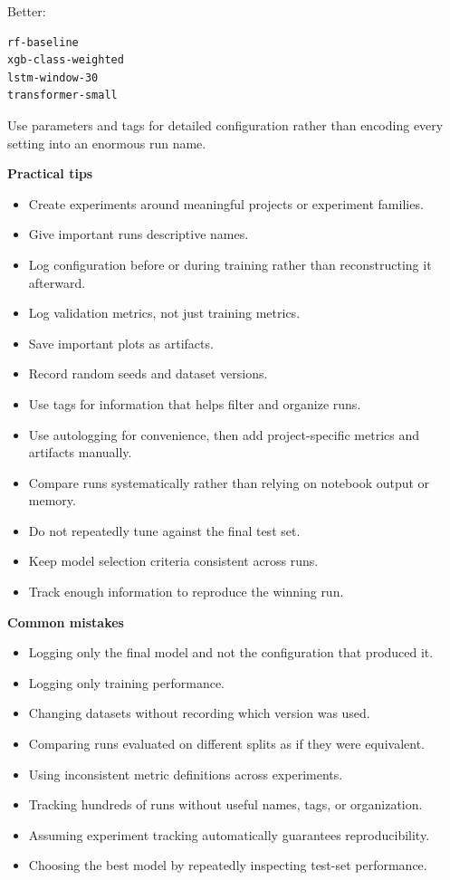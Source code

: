 \documentclass[11pt,letterpaper]{article}
\begin{document}
Better:

\begin{lstlisting}
rf-baseline
xgb-class-weighted
lstm-window-30
transformer-small
\end{lstlisting}

Use parameters and tags for detailed configuration rather than encoding every
setting into an enormous run name.

\textbf{Practical tips}

\begin{itemize}[leftmargin=*]
    \item Create experiments around meaningful projects or experiment families.
    \item Give important runs descriptive names.
    \item Log configuration before or during training rather than reconstructing it
    afterward.
    \item Log validation metrics, not just training metrics.
    \item Save important plots as artifacts.
    \item Record random seeds and dataset versions.
    \item Use tags for information that helps filter and organize runs.
    \item Use autologging for convenience, then add project-specific metrics and
    artifacts manually.
    \item Compare runs systematically rather than relying on notebook output or
    memory.
    \item Do not repeatedly tune against the final test set.
    \item Keep model selection criteria consistent across runs.
    \item Track enough information to reproduce the winning run.
\end{itemize}

\textbf{Common mistakes}

\begin{itemize}[leftmargin=*]
    \item Logging only the final model and not the configuration that produced it.
    \item Logging only training performance.
    \item Changing datasets without recording which version was used.
    \item Comparing runs evaluated on different splits as if they were equivalent.
    \item Using inconsistent metric definitions across experiments.
    \item Tracking hundreds of runs without useful names, tags, or organization.
    \item Assuming experiment tracking automatically guarantees reproducibility.
    \item Choosing the best model by repeatedly inspecting test-set performance.
\end{itemize}
\end{document}
